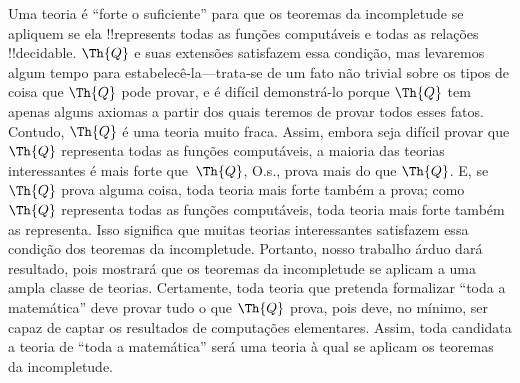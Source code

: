 \documentclass[../../../include/open-logic-section]{subfiles}
\begin{document}
Uma teoria é ``forte o suficiente'' para que os teoremas da
incompletude se apliquem se ela !!{represents} todas as funções
computáveis e todas as relações !!{decidable}. $\Th{Q}$ e suas
extensões satisfazem essa condição, mas levaremos algum tempo para
estabelecê-la---trata-se de um fato não trivial sobre os tipos de coisa
que $\Th{Q}$ pode provar, e é difícil demonstrá-lo porque $\Th{Q}$ tem
apenas alguns axiomas a partir dos quais teremos de provar todos esses
fatos. Contudo, $\Th{Q}$ é uma teoria muito fraca. Assim, embora seja
difícil provar que $\Th{Q}$ representa todas as funções computáveis, a
maioria das teorias interessantes é mais forte que~$\Th{Q}$, O.s.\@,
prova mais do que $\Th{Q}$. E, se $\Th{Q}$ prova alguma coisa, toda
teoria mais forte também a prova; como $\Th{Q}$ representa todas as
funções computáveis, toda teoria mais forte também as representa. Isso
significa que muitas teorias interessantes satisfazem essa condição
dos teoremas da incompletude. Portanto, nosso trabalho árduo dará
resultado, pois mostrará que os teoremas da incompletude se aplicam a
uma ampla classe de teorias. Certamente, toda teoria que pretenda
formalizar ``toda a matemática'' deve provar tudo o que $\Th{Q}$ prova,
pois deve, no mínimo, ser capaz de captar os resultados de computações
elementares. Assim, toda candidata a teoria de ``toda a matemática''
será uma teoria à qual se aplicam os teoremas da incompletude.
\end{document}
